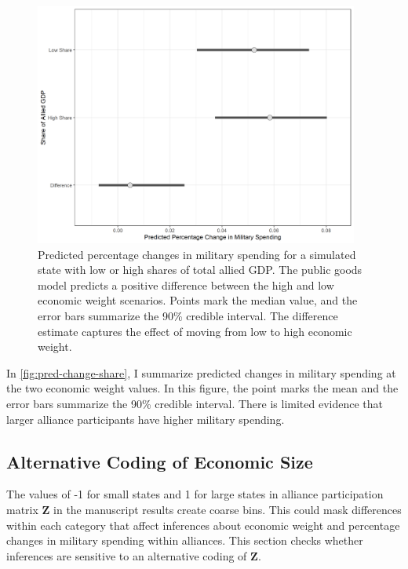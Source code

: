 \documentclass[12pt]{article}
\begin{document}
\begin{figure}[htbp]
	\centering
		\includegraphics[width=0.95\textwidth]{pred-change-share.png}
	\caption{Predicted percentage changes in military spending for a simulated state with low or high shares of total allied GDP. The public goods model predicts a positive difference between the high and low economic weight scenarios. Points mark the median value, and the error bars summarize the 90\% credible interval. The difference estimate captures the effect of moving from low to high economic weight.}
	\label{fig:pred-change-share}
\end{figure}


In \autoref{fig:pred-change-share}, I summarize predicted changes in military spending at the two economic weight values. 
In this figure, the point marks the mean and the error bars summarize the 90\% credible interval. 
There is limited evidence that larger alliance participants have higher military spending. 




\subsection{Alternative Coding of Economic Size}


The values of -1 for small states and 1 for large states in alliance participation matrix $\textbf{Z}$ in the manuscript results create coarse bins. 
This could mask differences within each category that affect inferences about economic weight and percentage changes in military spending within alliances. 
This section checks whether inferences are sensitive to an alternative coding of $\textbf{Z}$. 
\end{document}
